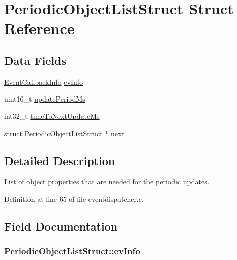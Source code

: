 \hypertarget{struct_periodic_object_list_struct}{\section{\-Periodic\-Object\-List\-Struct \-Struct \-Reference}
\label{struct_periodic_object_list_struct}
}
\subsection*{\-Data \-Fields}
\begin{DoxyCompactItemize}
\item 
\hyperlink{struct_event_callback_info}{\-Event\-Callback\-Info} \hyperlink{struct_periodic_object_list_struct_aa9f3d67a5c62c87059e84abb1cfb857b}{ev\-Info}
\item 
uint16\-\_\-t \hyperlink{struct_periodic_object_list_struct_a8473f34184b9b0caa6e10095501984f2}{update\-Period\-Ms}
\item 
int32\-\_\-t \hyperlink{struct_periodic_object_list_struct_ac03f97c098b138d52415563b1dd2b333}{time\-To\-Next\-Update\-Ms}
\item 
struct \hyperlink{struct_periodic_object_list_struct}{\-Periodic\-Object\-List\-Struct} $\ast$ \hyperlink{struct_periodic_object_list_struct_a53ed6bc407c59100bcfddb3a49ccb88f}{next}
\end{DoxyCompactItemize}


\subsection{\-Detailed \-Description}
\-List of object properties that are needed for the periodic updates. 

\-Definition at line 65 of file eventdispatcher.\-c.



\subsection{\-Field \-Documentation}
\hypertarget{struct_periodic_object_list_struct_aa9f3d67a5c62c87059e84abb1cfb857b}{
\subsubsection[{ev\-Info}]{ {\bf \-Periodic\-Object\-List\-Struct\-::ev\-Info}}}\label{struct_periodic_object_list_struct_aa9f3d67a5c62c87059e84abb1cfb857b}


